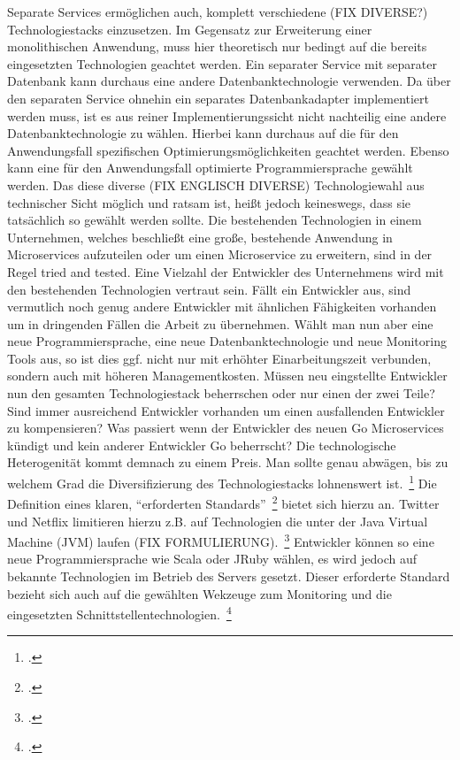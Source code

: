 Separate Services ermöglichen auch, komplett verschiedene (FIX DIVERSE?) Technologiestacks einzusetzen. Im Gegensatz zur Erweiterung einer monolithischen Anwendung, muss hier theoretisch nur bedingt auf die bereits eingesetzten Technologien geachtet werden. Ein separater Service mit separater Datenbank kann durchaus eine andere Datenbanktechnologie verwenden. Da über den separaten Service ohnehin ein separates Datenbankadapter implementiert werden muss, ist es aus reiner Implementierungssicht nicht nachteilig eine andere Datenbanktechnologie zu wählen. Hierbei kann durchaus auf die für den Anwendungsfall spezifischen Optimierungsmöglichkeiten geachtet werden. Ebenso kann eine für den Anwendungsfall optimierte Programmiersprache gewählt werden.
Das diese diverse (FIX ENGLISCH DIVERSE) Technologiewahl aus technischer Sicht möglich und ratsam ist, heißt jedoch keineswegs, dass sie tatsächlich so gewählt werden sollte. Die bestehenden Technologien in einem Unternehmen, welches beschließt eine große, bestehende Anwendung in Microservices aufzuteilen oder um einen Microservice zu erweitern, sind in der Regel tried and tested. Eine Vielzahl der Entwickler des Unternehmens wird mit den bestehenden Technologien vertraut sein. Fällt ein Entwickler aus, sind vermutlich noch genug andere Entwickler mit ähnlichen Fähigkeiten vorhanden um in dringenden Fällen die Arbeit zu übernehmen. Wählt man nun aber eine neue Programmiersprache, eine neue Datenbanktechnologie und neue Monitoring Tools aus, so ist dies ggf. nicht nur mit erhöhter Einarbeitungszeit verbunden, sondern auch mit höheren Managementkosten. Müssen neu eingstellte Entwickler nun den gesamten Technologiestack beherrschen oder nur einen der zwei Teile? Sind immer ausreichend Entwickler vorhanden um einen ausfallenden Entwickler zu kompensieren? Was passiert wenn der Entwickler des neuen Go Microservices kündigt und kein anderer Entwickler Go beherrscht? Die technologische Heterogenität kommt demnach zu einem Preis. Man sollte genau abwägen, bis zu welchem Grad die Diversifizierung des Technologiestacks lohnenswert ist.~\footcite[vgl.][Seiten 5, 6]{newman2015building}
Die Definition eines klaren, ``erforderten Standards''~\footcite[vgl.][Seiten 20, 21]{newman2015building} bietet sich hierzu an. Twitter und Netflix limitieren hierzu z.B. auf Technologien die unter der Java Virtual Machine (JVM) laufen (FIX FORMULIERUNG).~\footcite[][Seite 6]{newman2015building} Entwickler können so eine neue Programmiersprache wie Scala oder JRuby wählen, es wird jedoch auf bekannte Technologien im Betrieb des Servers gesetzt. Dieser erforderte Standard bezieht sich auch auf die gewählten Wekzeuge zum Monitoring und die eingesetzten Schnittstellentechnologien.~\footcite[vgl.][Seite 21]{newman2015building}

